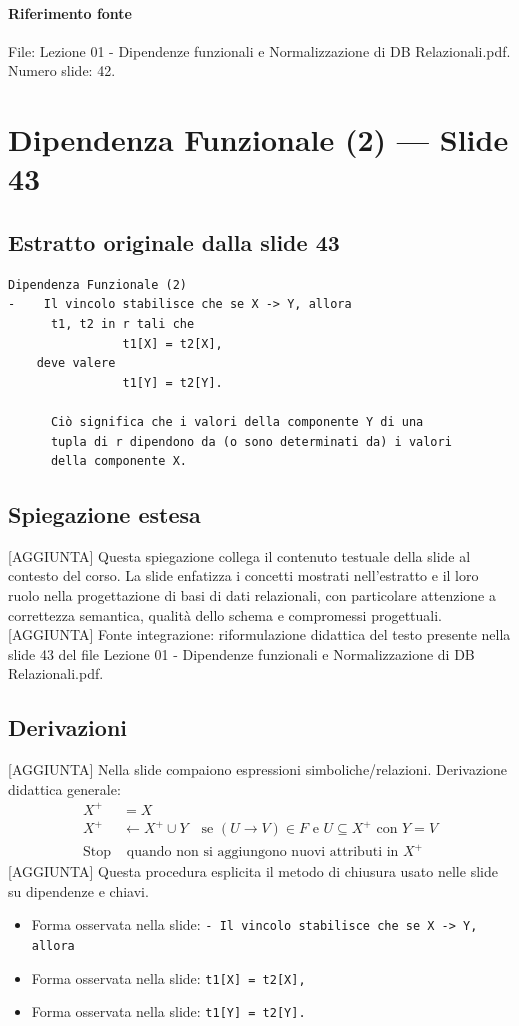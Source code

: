 \documentclass[11pt]{article}
\begin{document}
\paragraph{Riferimento fonte} File: Lezione 01 - Dipendenze funzionali e Normalizzazione di DB Relazionali.pdf. Numero slide: 42.
\section{Dipendenza Funzionale (2) --- Slide 43}
\subsection*{Estratto originale dalla slide 43}
\begin{lstlisting}
Dipendenza Funzionale (2)
-    Il vincolo stabilisce che se X -> Y, allora
      t1, t2 in r tali che
                t1[X] = t2[X],
    deve valere
                t1[Y] = t2[Y].

      Ciò significa che i valori della componente Y di una
      tupla di r dipendono da (o sono determinati da) i valori
      della componente X.
\end{lstlisting}
\subsection*{Spiegazione estesa}
[AGGIUNTA] Questa spiegazione collega il contenuto testuale della slide al contesto del corso. La slide enfatizza i concetti mostrati nell'estratto e il loro ruolo nella progettazione di basi di dati relazionali, con particolare attenzione a correttezza semantica, qualità dello schema e compromessi progettuali.
[AGGIUNTA] Fonte integrazione: riformulazione didattica del testo presente nella slide 43 del file Lezione 01 - Dipendenze funzionali e Normalizzazione di DB Relazionali.pdf.
\subsection*{Derivazioni}
[AGGIUNTA] Nella slide compaiono espressioni simboliche/relazioni. Derivazione didattica generale:
\begin{align*}
X^+ &= X \\
X^+ &\leftarrow X^+ \cup Y \quad \text{se } (U \to V) \in F \text{ e } U \subseteq X^+ \text{ con } Y=V \\
\text{Stop} &\text{ quando non si aggiungono nuovi attributi in } X^+
\end{align*}
[AGGIUNTA] Questa procedura esplicita il metodo di chiusura usato nelle slide su dipendenze e chiavi.
\begin{itemize}[leftmargin=*]
\item Forma osservata nella slide: \texttt{-    Il vincolo stabilisce che se X -> Y, allora}
\item Forma osservata nella slide: \texttt{t1[X] = t2[X],}
\item Forma osservata nella slide: \texttt{t1[Y] = t2[Y].}
\end{itemize}
\end{document}
